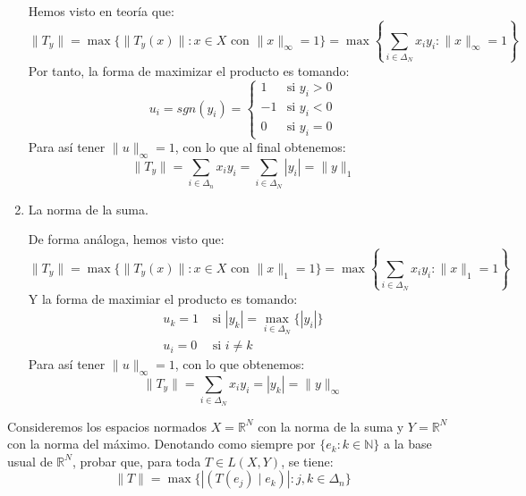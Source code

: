 \begin{ejercicio}
\begin{enumerate}
            Hemos visto en teoría que:
            \begin{equation*}
                \|T_y\| = \max \{\|T_y(x)\| : x \in X \text{\ con\ } \|x\|_\infty = 1\} = \max\left\{\sum_{i \in \Delta_N} x_iy_i : \|x\|_\infty = 1\right\}
            \end{equation*}
            Por tanto, la forma de maximizar el producto es tomando:
            \begin{equation*}
                u_i = sgn(y_i) = \left\{\begin{array}{ll}
                        1 & \text{si\ } y_i > 0 \\
                        -1 & \text{si\ } y_i < 0 \\
                        0 & \text{si\ } y_i = 0
                \end{array}\right.
            \end{equation*}
                Para así tener $\|u\|_\infty = 1$, con lo que al final obtenemos:
                \begin{equation*}
                    \|T_y\| = \sum_{i \in \Delta_n} x_i y_i = \sum_{i \in \Delta_N} |y_i| = \|y\|_1
                \end{equation*}
        \item La norma de la suma.

            De forma análoga, hemos visto que:
            \begin{equation*}
                \|T_y\| = \max \{\|T_y(x)\| : x \in X \text{\ con\ } \|x\|_1 = 1\} = \max\left\{\sum_{i \in \Delta_N} x_iy_i : \|x\|_1 = 1\right\}
            \end{equation*}
            Y la forma de maximiar el producto es tomando:
            \begin{align*}
                u_k = 1 &\text{\ si\ } |y_k| = \max_{i \in \Delta_N} \{|y_i|\} \\
                u_i = 0 &\text{\ si\ } i\neq k
            \end{align*}
            Para así tener $\|u\|_\infty = 1$, con lo que obtenemos:
            \begin{equation*}
                \|T_y\| = \sum_{i \in \Delta_N}x_iy_i = |y_k| = \|y\|_\infty
            \end{equation*}
    \end{enumerate}
    \end{ejercicio}
    
    \begin{ejercicio}
    Consideremos los espacios normados \( X = \mathbb{R}^N \) con la norma de la suma y \( Y = \mathbb{R}^N \) con la norma del máximo. Denotando como siempre por \( \{ e_k : k \in \mathbb{N} \} \) a la base usual de \( \mathbb{R}^N \), probar que, para toda \( T \in L(X,Y) \), se tiene:
    \[
    \|T\| = \max \{ |\left(T(e_j)\mid e_k \right)| : j,k \in \Delta_n \}
    \]
    \end{ejercicio}
    
